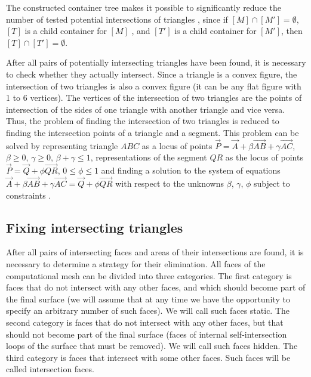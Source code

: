 \documentclass[
11pt,
tightenlines,
twoside,
onecolumn,
nofloats,
nobibnotes,
nofootinbib,
superscriptaddress,
noshowpacs,
centertags]
{revtex4}
\begin{document}
The constructed container tree makes it possible to significantly reduce the number of tested potential intersections of triangles \cite{Jung}, since if $[M] \cap [M'] = \emptyset$, $[T]$ is a child container for $[M]$ , and $[T']$ is a child container for $[M']$, then $[T] \cap [T'] = \emptyset$.

After all pairs of potentially intersecting triangles have been found, it is necessary to check whether they actually intersect.
Since a triangle is a convex figure, the intersection of two triangles is also a convex figure (it can be any flat figure with 1 to 6 vertices).
The vertices of the intersection of two triangles are the points of intersection of the sides of one triangle with another triangle and vice versa.
Thus, the problem of finding the intersection of two triangles is reduced to finding the intersection points of a triangle and a segment.
This problem can be solved by representing triangle $ABC$ as a locus of points $\vec{P} = \vec{A} + \beta \vec{AB} + \gamma \vec{AC}$, $\beta \ge 0$, $\gamma \ge 0$, $\beta + \gamma \le 1$, representations of the segment $QR$ as the locus of points $\vec{P} = \vec{Q} + \phi \vec{QR}$, $0 \le \phi \le 1$ and finding a solution to the system of equations $\vec{A} + \beta \vec{AB} + \gamma \vec{AC} = \vec{Q} + \phi \vec{QR}$ with respect to the unknowns $\beta$, $\gamma$, $\phi$ subject to constraints \cite{Freylekhman}.

\subsection{Fixing intersecting triangles}

After all pairs of intersecting faces and areas of their intersections are found, it is necessary to determine a strategy for their elimination.
All faces of the computational mesh can be divided into three categories.
The first category is faces that do not intersect with any other faces, and which should become part of the final surface (we will assume that at any time we have the opportunity to specify an arbitrary number of such faces).
We will call such faces static.
The second category is faces that do not intersect with any other faces, but that should not become part of the final surface (faces of internal self-intersection loops of the surface that must be removed).
We will call such faces hidden.
The third category is faces that intersect with some other faces.
Such faces will be called intersection faces.
\end{document}
